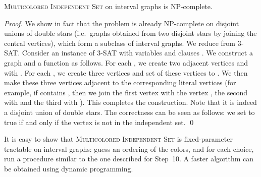 \documentclass{llncs}
\newcommand{\ie}{i.e.~}
\newcommand{\problemMCIS}{\textsc{Multicolored Independent Set}}
\begin{document}
\begin{theorem}
\problemMCIS{} on interval graphs is NP-complete.
\end{theorem}
\begin{proof}
We show in fact that the problem is already NP-complete on disjoint unions of double stars (\ie graphs obtained from two disjoint stars by joining the central vertices), which form a subclass of interval graphs. We reduce from \textsc{3-SAT}. Consider an instance of \textsc{3-SAT} with  variables  and  clauses . We construct a graph  and a function  as follows. For each , we create two adjacent vertices  and  with . For each , we create three vertices and set  of these vertices to . We then make these three vertices adjacent to the corresponding literal vertices (for example, if  contains , then we join the first vertex with the vertex , the second with  and the third with ). This completes the construction. Note that it is indeed a disjoint union of double stars. The correctness can be seen as follows: we set  to true if and only if the vertex  is not in the independent set.
\qed\end{proof}
It is easy to show that \problemMCIS{} is fixed-parameter tractable on interval graphs: guess an ordering of the colors, and for each choice, run a procedure similar to the one described for Step~10. A faster algorithm can be obtained using dynamic programming.
\end{document}
